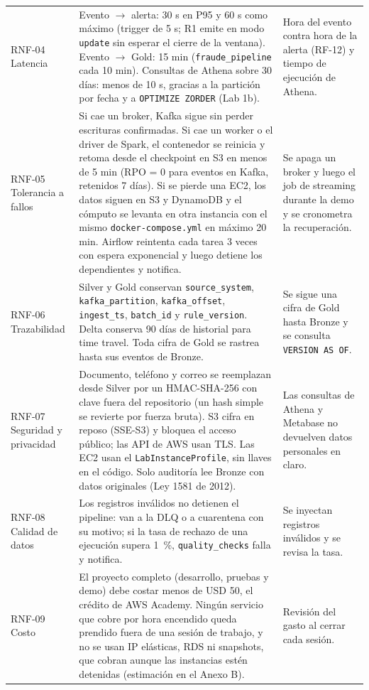 \documentclass[12pt,letterpaper]{article}
\newcommand{\code}[1]{{\small\texttt{#1}}}
\begin{document}
\begin{footnotesize}
\begin{longtable}{@{}P{0.8in}P{3.95in}P{1.7in}@{}}
RNF-04 Latencia & Evento $\rightarrow$ alerta: 30 s en P95 y 60 s como máximo (trigger de 5 s; R1 emite en modo \code{update} sin esperar el cierre de la ventana). Evento $\rightarrow$ Gold: 15 min (\code{fraude\_pipeline} cada 10 min). Consultas de Athena sobre 30 días: menos de 10 s, gracias a la partición por fecha y a \code{OPTIMIZE ZORDER} (Lab 1b). & Hora del evento contra hora de la alerta (RF-12) y tiempo de ejecución de Athena.\\[1pt]
RNF-05 Tolerancia a fallos & Si cae un broker, Kafka sigue sin perder escrituras confirmadas. Si cae un worker o el driver de Spark, el contenedor se reinicia y retoma desde el checkpoint en S3 en menos de 5 min (RPO = 0 para eventos en Kafka, retenidos 7 días). Si se pierde una EC2, los datos siguen en S3 y DynamoDB y el cómputo se levanta en otra instancia con el mismo \code{docker-compose.yml} en máximo 20 min. Airflow reintenta cada tarea 3 veces con espera exponencial y luego detiene los dependientes y notifica. & Se apaga un broker y luego el job de streaming durante la demo y se cronometra la recuperación.\\[1pt]
RNF-06 Trazabilidad & Silver y Gold conservan \code{source\_system}, \code{kafka\_partition}, \code{kafka\_offset}, \code{ingest\_ts}, \code{batch\_id} y \code{rule\_version}. Delta conserva 90 días de historial para time travel. Toda cifra de Gold se rastrea hasta sus eventos de Bronze. & Se sigue una cifra de Gold hasta Bronze y se consulta \code{VERSION AS OF}.\\[1pt]
RNF-07 Seguridad y privacidad & Documento, teléfono y correo se reemplazan desde Silver por un HMAC-SHA-256 con clave fuera del repositorio (un hash simple se revierte por fuerza bruta). S3 cifra en reposo (SSE-S3) y bloquea el acceso público; las API de AWS usan TLS. Las EC2 usan el \code{LabInstanceProfile}, sin llaves en el código. Solo auditoría lee Bronze con datos originales (Ley 1581 de 2012). & Las consultas de Athena y Metabase no devuelven datos personales en claro.\\[1pt]
RNF-08 Calidad de datos & Los registros inválidos no detienen el pipeline: van a la DLQ o a cuarentena con su motivo; si la tasa de rechazo de una ejecución supera 1~\%, \code{quality\_checks} falla y notifica. & Se inyectan registros inválidos y se revisa la tasa.\\[1pt]
RNF-09 Costo & El proyecto completo (desarrollo, pruebas y demo) debe costar menos de USD 50, el crédito de AWS Academy. Ningún servicio que cobre por hora encendido queda prendido fuera de una sesión de trabajo, y no se usan IP elásticas, RDS ni snapshots, que cobran aunque las instancias estén detenidas (estimación en el Anexo B). & Revisión del gasto al cerrar cada sesión.\\
\end{longtable}
\end{footnotesize}
\end{document}
